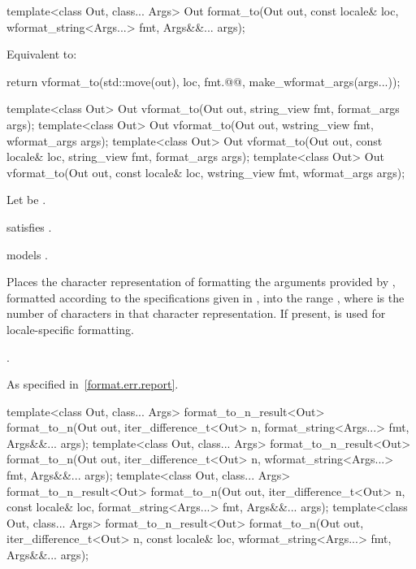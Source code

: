 %
\begin{itemdecl}
template<class Out, class... Args>
  Out format_to(Out out, const locale& loc, wformat_string<Args...> fmt, Args&&... args);
\end{itemdecl}

\begin{itemdescr}
\pnum
\effects
Equivalent to:
\begin{codeblock}
return vformat_to(std::move(out), loc, fmt.@@, make_wformat_args(args...));
\end{codeblock}
\end{itemdescr}

%
\begin{itemdecl}
template<class Out>
  Out vformat_to(Out out, string_view fmt, format_args args);
template<class Out>
  Out vformat_to(Out out, wstring_view fmt, wformat_args args);
template<class Out>
  Out vformat_to(Out out, const locale& loc, string_view fmt, format_args args);
template<class Out>
  Out vformat_to(Out out, const locale& loc, wstring_view fmt, wformat_args args);
\end{itemdecl}

\begin{itemdescr}
\pnum
Let  be .

\pnum
\constraints
{} satisfies .

\pnum
\expects
{} models .

\pnum
\effects
Places the character representation of formatting
the arguments provided by ,
formatted according to the specifications given in ,
into the range ,
where  is the number of characters in that character representation.
If present,  is used for locale-specific formatting.

\pnum
\returns
{}.

\pnum
\throws
As specified in~\ref{format.err.report}.
\end{itemdescr}

%
\begin{itemdecl}
template<class Out, class... Args>
  format_to_n_result<Out> format_to_n(Out out, iter_difference_t<Out> n,
                                      format_string<Args...> fmt, Args&&... args);
template<class Out, class... Args>
  format_to_n_result<Out> format_to_n(Out out, iter_difference_t<Out> n,
                                      wformat_string<Args...> fmt, Args&&... args);
template<class Out, class... Args>
  format_to_n_result<Out> format_to_n(Out out, iter_difference_t<Out> n,
                                      const locale& loc, format_string<Args...> fmt,
                                      Args&&... args);
template<class Out, class... Args>
  format_to_n_result<Out> format_to_n(Out out, iter_difference_t<Out> n,
                                      const locale& loc, wformat_string<Args...> fmt,
                                      Args&&... args);
\end{itemdecl}

